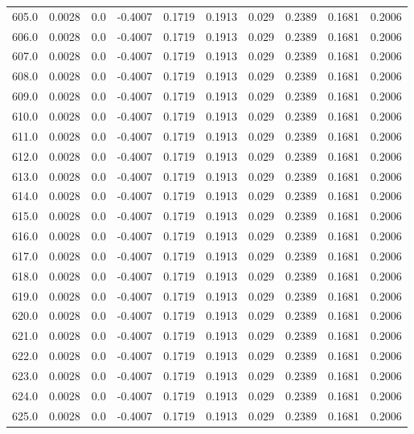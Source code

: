 \begin{longtable}{lrrrrrrrrr}
605.0 & 0.0028 & 0.0 & -0.4007 & 0.1719 & 0.1913 & 0.029 & 0.2389 & 0.1681 & 0.2006 \\
606.0 & 0.0028 & 0.0 & -0.4007 & 0.1719 & 0.1913 & 0.029 & 0.2389 & 0.1681 & 0.2006 \\
607.0 & 0.0028 & 0.0 & -0.4007 & 0.1719 & 0.1913 & 0.029 & 0.2389 & 0.1681 & 0.2006 \\
608.0 & 0.0028 & 0.0 & -0.4007 & 0.1719 & 0.1913 & 0.029 & 0.2389 & 0.1681 & 0.2006 \\
609.0 & 0.0028 & 0.0 & -0.4007 & 0.1719 & 0.1913 & 0.029 & 0.2389 & 0.1681 & 0.2006 \\
610.0 & 0.0028 & 0.0 & -0.4007 & 0.1719 & 0.1913 & 0.029 & 0.2389 & 0.1681 & 0.2006 \\
611.0 & 0.0028 & 0.0 & -0.4007 & 0.1719 & 0.1913 & 0.029 & 0.2389 & 0.1681 & 0.2006 \\
612.0 & 0.0028 & 0.0 & -0.4007 & 0.1719 & 0.1913 & 0.029 & 0.2389 & 0.1681 & 0.2006 \\
613.0 & 0.0028 & 0.0 & -0.4007 & 0.1719 & 0.1913 & 0.029 & 0.2389 & 0.1681 & 0.2006 \\
614.0 & 0.0028 & 0.0 & -0.4007 & 0.1719 & 0.1913 & 0.029 & 0.2389 & 0.1681 & 0.2006 \\
615.0 & 0.0028 & 0.0 & -0.4007 & 0.1719 & 0.1913 & 0.029 & 0.2389 & 0.1681 & 0.2006 \\
616.0 & 0.0028 & 0.0 & -0.4007 & 0.1719 & 0.1913 & 0.029 & 0.2389 & 0.1681 & 0.2006 \\
617.0 & 0.0028 & 0.0 & -0.4007 & 0.1719 & 0.1913 & 0.029 & 0.2389 & 0.1681 & 0.2006 \\
618.0 & 0.0028 & 0.0 & -0.4007 & 0.1719 & 0.1913 & 0.029 & 0.2389 & 0.1681 & 0.2006 \\
619.0 & 0.0028 & 0.0 & -0.4007 & 0.1719 & 0.1913 & 0.029 & 0.2389 & 0.1681 & 0.2006 \\
620.0 & 0.0028 & 0.0 & -0.4007 & 0.1719 & 0.1913 & 0.029 & 0.2389 & 0.1681 & 0.2006 \\
621.0 & 0.0028 & 0.0 & -0.4007 & 0.1719 & 0.1913 & 0.029 & 0.2389 & 0.1681 & 0.2006 \\
622.0 & 0.0028 & 0.0 & -0.4007 & 0.1719 & 0.1913 & 0.029 & 0.2389 & 0.1681 & 0.2006 \\
623.0 & 0.0028 & 0.0 & -0.4007 & 0.1719 & 0.1913 & 0.029 & 0.2389 & 0.1681 & 0.2006 \\
624.0 & 0.0028 & 0.0 & -0.4007 & 0.1719 & 0.1913 & 0.029 & 0.2389 & 0.1681 & 0.2006 \\
625.0 & 0.0028 & 0.0 & -0.4007 & 0.1719 & 0.1913 & 0.029 & 0.2389 & 0.1681 & 0.2006 \\

\end{longtable}
